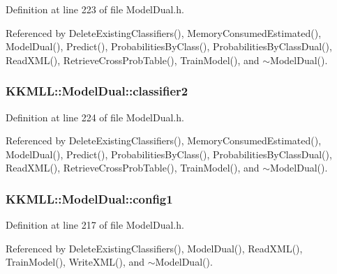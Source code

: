 Definition at line 223 of file Model\+Dual.\+h.



Referenced by Delete\+Existing\+Classifiers(), Memory\+Consumed\+Estimated(), Model\+Dual(), Predict(), Probabilities\+By\+Class(), Probabilities\+By\+Class\+Dual(), Read\+X\+M\+L(), Retrieve\+Cross\+Prob\+Table(), Train\+Model(), and $\sim$\+Model\+Dual().

\subsubsection[{\texorpdfstring{classifier2}{classifier2}}]{ K\+K\+M\+L\+L\+::\+Model\+Dual\+::classifier2\hspace{0.3cm}{\ttfamily [protected]}}\hypertarget{class_k_k_m_l_l_1_1_model_dual_a18ed538fadc0cb3eebdb9175ccce22e2}{}\label{class_k_k_m_l_l_1_1_model_dual_a18ed538fadc0cb3eebdb9175ccce22e2}


Definition at line 224 of file Model\+Dual.\+h.



Referenced by Delete\+Existing\+Classifiers(), Memory\+Consumed\+Estimated(), Model\+Dual(), Predict(), Probabilities\+By\+Class(), Probabilities\+By\+Class\+Dual(), Read\+X\+M\+L(), Retrieve\+Cross\+Prob\+Table(), Train\+Model(), and $\sim$\+Model\+Dual().

\subsubsection[{\texorpdfstring{config1}{config1}}]{ K\+K\+M\+L\+L\+::\+Model\+Dual\+::config1\hspace{0.3cm}{\ttfamily [protected]}}\hypertarget{class_k_k_m_l_l_1_1_model_dual_a1d0f07c3ee783f1f91bcb5436c968908}{}\label{class_k_k_m_l_l_1_1_model_dual_a1d0f07c3ee783f1f91bcb5436c968908}


Definition at line 217 of file Model\+Dual.\+h.



Referenced by Delete\+Existing\+Classifiers(), Model\+Dual(), Read\+X\+M\+L(), Train\+Model(), Write\+X\+M\+L(), and $\sim$\+Model\+Dual().

